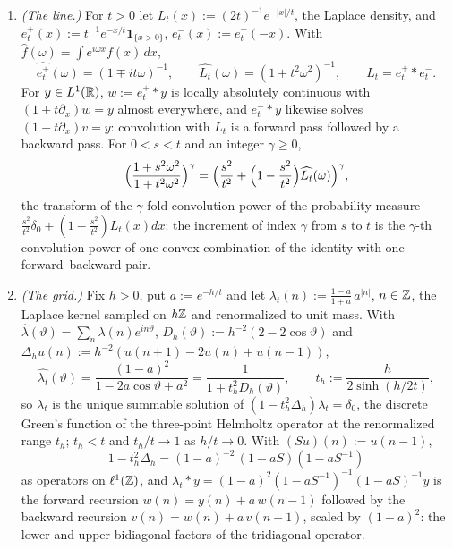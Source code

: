 \begin{proposition}
\label{prop:recursion-helmholtz}

\begin{enumerate}
\item \emph{(The line.)} For $t > 0$ let $L_t(x) := (2t)^{-1}e^{-|x|/t}$, the Laplace density,
and $e^+_t(x) := t^{-1}e^{-x/t}\mathbf 1_{\{x > 0\}}$, $e^-_t(x) := e^+_t(-x)$. With
$\widehat f(\omega) = \int e^{i\omega x}f(x)\,dx$,
\[
  \widehat{e^\pm_t}(\omega) = (1 \mp it\omega)^{-1}, \qquad
  \widehat{L_t}(\omega) = (1 + t^2\omega^2)^{-1}, \qquad L_t = e^+_t * e^-_t .
\]
For $y \in L^1(\mathbb{R})$, $w := e^+_t * y$ is locally absolutely continuous with
$(1 + t\partial_x)w = y$ almost everywhere, and $e^-_t * y$ likewise solves
$(1 - t\partial_x)v = y$: convolution with $L_t$ is a forward pass followed by a backward pass.
For $0 < s < t$ and an integer $\gamma \ge 0$,
\[
  \Bigl(\frac{1 + s^2\omega^2}{1 + t^2\omega^2}\Bigr)^{\gamma}
   = \Bigl(\frac{s^2}{t^2} + \Bigl(1 - \frac{s^2}{t^2}\Bigr)\widehat{L_t}(\omega)\Bigr)^{\gamma} ,
\]
the transform of the $\gamma$-fold convolution power of the probability measure
$\tfrac{s^2}{t^2}\delta_0 + (1 - \tfrac{s^2}{t^2})L_t(x)dx$: the \Matern{} increment of index
$\gamma$ from $s$ to $t$ is the $\gamma$-th convolution power of one convex combination of the
identity with one forward--backward pair.
\item \emph{(The grid.)} Fix $h > 0$, put $a := e^{-h/t}$ and let
$\lambda_t(n) := \frac{1-a}{1+a}\,a^{|n|}$, $n \in \mathbb{Z}$, the Laplace kernel sampled on $h\mathbb{Z}$ and
renormalized to unit mass. With $\widehat\lambda(\vartheta) = \sum_n\lambda(n)e^{in\vartheta}$,
$D_h(\vartheta) := h^{-2}(2 - 2\cos\vartheta)$ and $\Delta_hu(n) := h^{-2}(u(n+1) - 2u(n) + u(n-1))$,
\[
  \widehat{\lambda_t}(\vartheta) = \frac{(1-a)^2}{1 - 2a\cos\vartheta + a^2}
   = \frac{1}{1 + t_h^2D_h(\vartheta)} ,
  \qquad t_h := \frac{h}{2\sinh(h/2t)} ,
\]
so $\lambda_t$ is the unique summable solution of $(1 - t_h^2\Delta_h)\lambda_t = \delta_0$, the
discrete Green's function of the three-point Helmholtz operator at the renormalized range $t_h$;
$t_h < t$ and $t_h/t \to 1$ as $h/t \to 0$. With $(Su)(n) := u(n-1)$,
\[
  1 - t_h^2\Delta_h = (1-a)^{-2}\,(1 - aS)(1 - aS^{-1})
\]
as operators on $\ell^1(\mathbb{Z})$, and $\lambda_t * y = (1-a)^2(1-aS^{-1})^{-1}(1-aS)^{-1}y$ is the
forward recursion $w(n) = y(n) + a\,w(n-1)$ followed by the backward recursion
$v(n) = w(n) + a\,v(n+1)$, scaled by $(1-a)^2$: the lower and upper bidiagonal factors of the
tridiagonal operator.
\end{enumerate}
\end{proposition}

